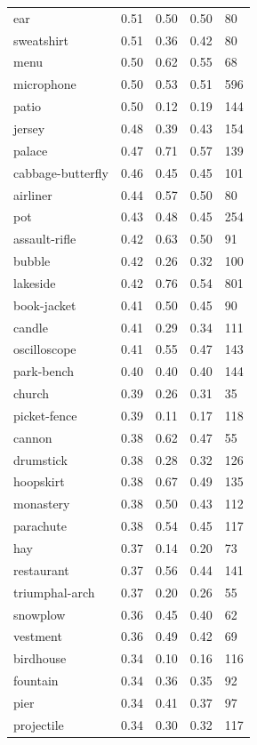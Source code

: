 \begin{center}
\begin{longtable}{lllll}
ear & 0.51 & 0.50 & 0.50 & 80 \\
sweatshirt & 0.51 & 0.36 & 0.42 & 80 \\
menu & 0.50 & 0.62 & 0.55 & 68 \\
microphone & 0.50 & 0.53 & 0.51 & 596 \\
patio & 0.50 & 0.12 & 0.19 & 144 \\
jersey & 0.48 & 0.39 & 0.43 & 154 \\
palace & 0.47 & 0.71 & 0.57 & 139 \\
cabbage-butterfly & 0.46 & 0.45 & 0.45 & 101 \\
airliner & 0.44 & 0.57 & 0.50 & 80 \\
pot & 0.43 & 0.48 & 0.45 & 254 \\
assault-rifle & 0.42 & 0.63 & 0.50 & 91 \\
bubble & 0.42 & 0.26 & 0.32 & 100 \\
lakeside & 0.42 & 0.76 & 0.54 & 801 \\
book-jacket & 0.41 & 0.50 & 0.45 & 90 \\
candle & 0.41 & 0.29 & 0.34 & 111 \\
oscilloscope & 0.41 & 0.55 & 0.47 & 143 \\
park-bench & 0.40 & 0.40 & 0.40 & 144 \\
church & 0.39 & 0.26 & 0.31 & 35 \\
picket-fence & 0.39 & 0.11 & 0.17 & 118 \\
cannon & 0.38 & 0.62 & 0.47 & 55 \\
drumstick & 0.38 & 0.28 & 0.32 & 126 \\
hoopskirt & 0.38 & 0.67 & 0.49 & 135 \\
monastery & 0.38 & 0.50 & 0.43 & 112 \\
parachute & 0.38 & 0.54 & 0.45 & 117 \\
hay & 0.37 & 0.14 & 0.20 & 73 \\
restaurant & 0.37 & 0.56 & 0.44 & 141 \\
triumphal-arch & 0.37 & 0.20 & 0.26 & 55 \\
snowplow & 0.36 & 0.45 & 0.40 & 62 \\
vestment & 0.36 & 0.49 & 0.42 & 69 \\
birdhouse & 0.34 & 0.10 & 0.16 & 116 \\
fountain & 0.34 & 0.36 & 0.35 & 92 \\
pier & 0.34 & 0.41 & 0.37 & 97 \\
projectile & 0.34 & 0.30 & 0.32 & 117 \\

\end{longtable}
\end{center}
